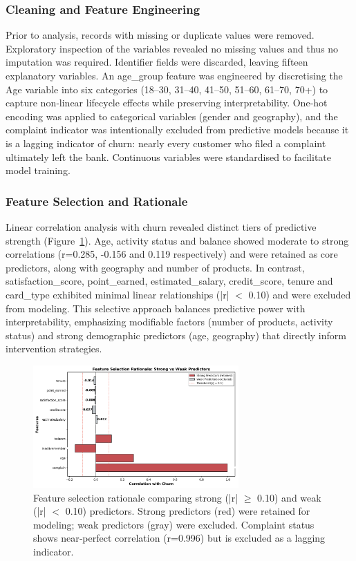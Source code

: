 \documentclass[12pt]{article}
\begin{document}
\subsubsection{Cleaning and Feature Engineering}
Prior to analysis, records with missing or duplicate values were removed.  Exploratory inspection of the variables revealed no missing values and thus no imputation was required.  Identifier fields were discarded, leaving fifteen explanatory variables.  An age\_group feature was engineered by discretising the Age variable into six categories (18–30, 31–40, 41–50, 51–60, 61–70, 70+) to capture non‑linear lifecycle effects while preserving interpretability.  One‑hot encoding was applied to categorical variables (gender and geography), and the complaint indicator was intentionally excluded from predictive models because it is a lagging indicator of churn: nearly every customer who filed a complaint ultimately left the bank.  Continuous variables were standardised to facilitate model training.

\subsubsection{Feature Selection and Rationale}
Linear correlation analysis with churn revealed distinct tiers of predictive strength (Figure~\ref{fig:feature_selection}).  Age, activity status and balance showed moderate to strong correlations (r=0.285, -0.156 and 0.119 respectively) and were retained as core predictors, along with geography and number of products.  In contrast, satisfaction\_score, point\_earned, estimated\_salary, credit\_score, tenure and card\_type exhibited minimal linear relationships (|r| $<$ 0.10) and were excluded from modeling.  This selective approach balances predictive power with interpretability, emphasizing modifiable factors (number of products, activity status) and strong demographic predictors (age, geography) that directly inform intervention strategies.

\begin{figure}[H]
\centering
\includegraphics[width=0.7\textwidth]{img/feature_selection_comparison.png}
\caption{Feature selection rationale comparing strong (|r| $\geq$ 0.10) and weak (|r| $<$ 0.10) predictors. Strong predictors (red) were retained for modeling; weak predictors (gray) were excluded. Complaint status shows near‑perfect correlation (r=0.996) but is excluded as a lagging indicator.}
\label{fig:feature_selection}
\end{figure}
\end{document}
